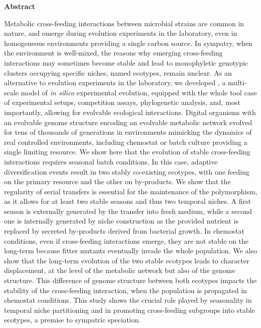 \begin{center}
\colorbox{grisclair}{
\begin{minipage}[t]{0.9\textwidth}
\begin{center}
\large{\textbf{Abstract}}
\end{center}
Metabolic cross-feeding interactions between microbial strains are common in nature, and emerge during evolution experiments in the laboratory, even in homogeneous environments providing a single carbon source. In sympatry, when the environment is well-mixed, the reasons why emerging cross-feeding interactions may sometimes become stable and lead to monophyletic genotypic clusters occupying specific niches, named ecotypes, remain unclear. As an alternative to evolution experiments in the laboratory, we developed {\EvoEvoSim}, a multi-scale model of \textit{in silico} experimental evolution, equipped with the whole tool case of experimental setups, competition assays, phylogenetic analysis, and, most importantly, allowing for evolvable ecological interactions. Digital organisms with an evolvable genome structure encoding an evolvable metabolic network evolved for tens of thousands of generations in environments mimicking the dynamics of real controlled environments, including chemostat or batch culture providing a single limiting resource. We show here that the evolution of stable cross-feeding interactions requires seasonal batch conditions. In this case, adaptive diversification events result in two stably co-existing ecotypes, with one feeding on the primary resource and the other on by-products. We show that the regularity of serial transfers is essential for the maintenance of the polymorphism, as it allows for at least two stable seasons and thus two temporal niches. A first season is externally generated by the transfer into fresh medium, while a second one is internally generated by niche construction as the provided nutrient is replaced by secreted by-products derived from bacterial growth. In chemostat conditions, even if cross-feeding interactions emerge, they are not stable on the long-term because fitter mutants eventually invade the whole population. We also show that the long-term evolution of the two stable ecotypes leads to character displacement, at the level of the metabolic network but also of the genome structure. This difference of genome structure between both ecotypes impacts the stability of the cross-feeding interaction, when the population is propagated in chemostat conditions. This study shows the crucial role played by seasonality in temporal niche partitioning and in promoting cross-feeding subgroups into stable ecotypes, a premise to sympatric speciation.
\end{minipage}
}     
\end{center}

